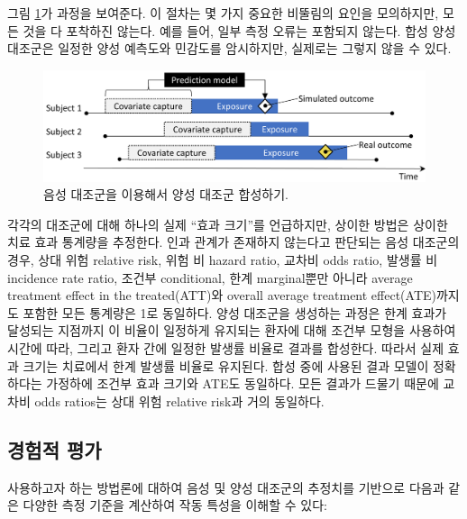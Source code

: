 \documentclass[10.5pt]{book}
\theoremstyle{definition}
\theoremstyle{definition}
\theoremstyle{definition}
\theoremstyle{remark}
\begin{document}
그림 \ref{fig:posControlSynth}가 과정을 보여준다. 이 절차는 몇 가지
중요한 비뚤림의 요인을 모의하지만, 모든 것을 다 포착하진 않는다. 예를
들어, 일부 측정 오류는 포함되지 않는다. 합성 양성 대조군은 일정한 양성
예측도와 민감도를 암시하지만, 실제로는 그렇지 않을 수 있다.

\begin{figure}

{\centering \includegraphics[width=0.9\linewidth]{images/MethodValidity/posControlSynth} 

}

\caption{음성 대조군을 이용해서 양성 대조군 합성하기.}\label{fig:posControlSynth}
\end{figure}

각각의 대조군에 대해 하나의 실제 ``효과 크기''를 언급하지만, 상이한
방법은 상이한 치료 효과 통계량을 추정한다. 인과 관계가 존재하지 않는다고
판단되는 음성 대조군의 경우, 상대 위험 relative risk, 위험 비 hazard
ratio, 교차비 odds ratio, 발생률 비 incidence rate ratio, 조건부
conditional, 한계 marginal뿐만 아니라 average treatment effect in the
treated(ATT)와 overall average treatment effect(ATE)까지도 포함한 모든
통계량은 1로 동일하다. 양성 대조군을 생성하는 과정은 한계 효과가
달성되는 지점까지 이 비율이 일정하게 유지되는 환자에 대해 조건부 모형을
사용하여 시간에 따라, 그리고 환자 간에 일정한 발생률 비율로 결과를
합성한다. 따라서 실제 효과 크기는 치료에서 한계 발생률 비율로 유지된다.
합성 중에 사용된 결과 모델이 정확하다는 가정하에 조건부 효과 크기와
ATE도 동일하다. 모든 결과가 드물기 때문에 교차비 odds ratios는 상대 위험
relative risk과 거의 동일하다.

\subsection{경험적 평가}\label{metrics}


사용하고자 하는 방법론에 대하여 음성 및 양성 대조군의 추정치를 기반으로
다음과 같은 다양한 측정 기준을 계산하여 작동 특성을 이해할 수 있다:
\end{document}
